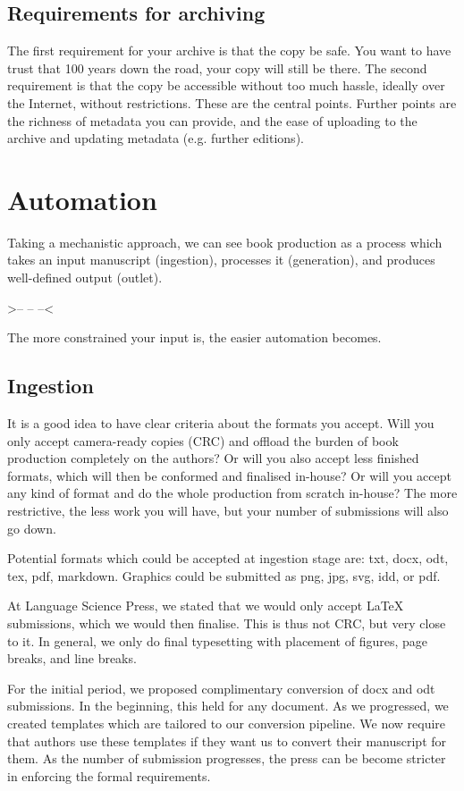 \documentclass[guidelines,nonflat,modfonts] {langsci/langscibook}
\begin{document}
\subsection{Requirements for archiving}
The first requirement for your archive is that the copy be safe. You want to have trust that 100 years down the road, your copy will still be there. The second requirement is that the copy be accessible without too much hassle, ideally over the Internet, without restrictions. These are the central points. Further points are the richness of metadata you can provide, and the ease of uploading to the archive and updating metadata (e.g. further editions).

\section{Automation}\label{sec:automation}
Taking a mechanistic approach, we can see book production as a process which takes an input manuscript (ingestion), processes it (generation), and produces well-defined output (outlet). 

\ea
>--  --  --< 
\z

The more constrained your input is, the easier automation becomes. 
 
                    
\subsection{Ingestion}
It is a good idea to have clear criteria about the formats you accept. Will you only accept camera-ready copies (CRC) and offload the burden of book production completely on the authors? Or will you also accept less finished formats, which will then be conformed and finalised in-house? Or will you accept any kind of format and do the whole production from scratch in-house? The more restrictive, the less work you will have, but your number of submissions will also go down. 

Potential formats which could be accepted at ingestion stage are: txt, docx, odt, tex, pdf, markdown. Graphics could be submitted as png, jpg, svg, idd, or pdf. 


At Language Science Press, we stated that we would only accept \LaTeX\xspace submissions, which we would then finalise. This is thus not CRC, but very close to it. In general, we only do final typesetting with placement of figures, page breaks, and line breaks. 

For the initial period, we proposed complimentary conversion of docx and odt submissions. In the beginning, this held for any document. As we progressed, we created templates which are tailored to our conversion pipeline. We now require that authors use these templates if they want us to convert their manuscript for them. As the number of submission progresses, the press can be become stricter in enforcing the formal requirements. 
\end{document}
